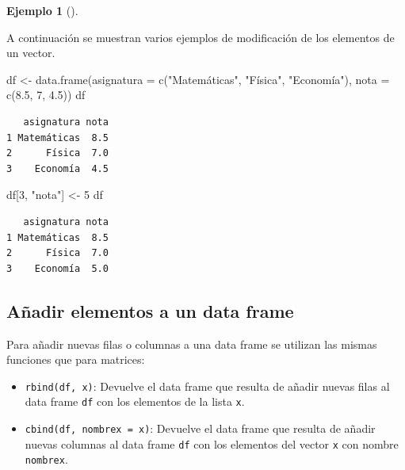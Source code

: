 \documentclass[
  a4paper,
]{scrreport}
\newenvironment{Shaded}{\begin{snugshade}}{\end{snugshade}}
\newcommand{\AttributeTok}[1]{\textcolor[rgb]{0.40,0.45,0.13}{#1}}
\newcommand{\DecValTok}[1]{\textcolor[rgb]{0.68,0.00,0.00}{#1}}
\newcommand{\FloatTok}[1]{\textcolor[rgb]{0.68,0.00,0.00}{#1}}
\newcommand{\FunctionTok}[1]{\textcolor[rgb]{0.28,0.35,0.67}{#1}}
\newcommand{\NormalTok}[1]{\textcolor[rgb]{0.00,0.23,0.31}{#1}}
\newcommand{\OtherTok}[1]{\textcolor[rgb]{0.00,0.23,0.31}{#1}}
\newcommand{\StringTok}[1]{\textcolor[rgb]{0.13,0.47,0.30}{#1}}
\theoremstyle{definition}
\newtheorem{example}{Ejemplo}[chapter]
\theoremstyle{definition}
\theoremstyle{remark}
\begin{document}
\leavevmode{}%
\begin{example}[]\label{exm-modificacion-data-frames}

A continuación se muestran varios ejemplos de modificación de los
elementos de un vector.

\begin{Shaded}
\begin{Highlighting}[]
\NormalTok{df }\OtherTok{\textless{}{-}} \FunctionTok{data.frame}\NormalTok{(}\AttributeTok{asignatura =} \FunctionTok{c}\NormalTok{(}\StringTok{"Matemáticas"}\NormalTok{, }\StringTok{"Física"}\NormalTok{, }\StringTok{"Economía"}\NormalTok{), }\AttributeTok{nota =} \FunctionTok{c}\NormalTok{(}\FloatTok{8.5}\NormalTok{, }\DecValTok{7}\NormalTok{, }\FloatTok{4.5}\NormalTok{))}
\NormalTok{df}
\end{Highlighting}
\end{Shaded}

\begin{verbatim}
   asignatura nota
1 Matemáticas  8.5
2      Física  7.0
3    Economía  4.5
\end{verbatim}

\begin{Shaded}
\begin{Highlighting}[]
\NormalTok{df[}\DecValTok{3}\NormalTok{, }\StringTok{"nota"}\NormalTok{] }\OtherTok{\textless{}{-}} \DecValTok{5}
\NormalTok{df}
\end{Highlighting}
\end{Shaded}

\begin{verbatim}
   asignatura nota
1 Matemáticas  8.5
2      Física  7.0
3    Economía  5.0
\end{verbatim}

\end{example}

\hypertarget{auxf1adir-elementos-a-un-data-frame}{%
\subsection{Añadir elementos a un data
frame}\label{auxf1adir-elementos-a-un-data-frame}}

Para añadir nuevas filas o columnas a una data frame se utilizan las
mismas funciones que para matrices:

\begin{itemize}
\item
  \texttt{rbind(df,\ x)}: Devuelve el data frame que resulta de añadir
  nuevas filas al data frame \texttt{df} con los elementos de la lista
  \texttt{x}.
\item
  \texttt{cbind(df,\ nombrex\ =\ x)}: Devuelve el data frame que resulta
  de añadir nuevas columnas al data frame \texttt{df} con los elementos
  del vector \texttt{x} con nombre \texttt{nombrex}.
\end{itemize}
\end{document}
